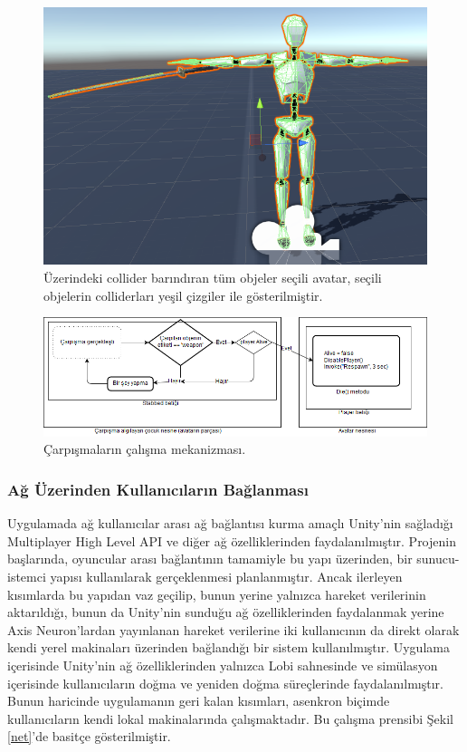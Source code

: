 \documentclass[a4paper, 12pt, titlepage]{article}
\begin{document}
\begin{figure}[ht!]
    \centering
        \includegraphics[width=5in]{images/c2}
    \caption{Üzerindeki collider barındıran tüm objeler seçili avatar, seçili objelerin
             colliderları yeşil çizgiler ile gösterilmiştir.}
    \label{c}
\end{figure}

\begin{figure}[ht!]
    \centering
        \includegraphics[width=6in]{images/col}
    \caption{Çarpışmaların çalışma mekanizması.}
    \label{col}
\end{figure}

\subsubsection{Ağ Üzerinden Kullanıcıların Bağlanması}
Uygulamada ağ kullanıcılar arası ağ bağlantısı kurma amaçlı Unity’nin sağladığı Multiplayer High
Level API ve diğer ağ özelliklerinden faydalanılmıştır. Projenin başlarında, oyuncular arası
bağlantının tamamiyle bu yapı üzerinden, bir sunucu-istemci yapısı kullanılarak gerçeklenmesi
planlanmıştır. Ancak ilerleyen kısımlarda bu yapıdan vaz geçilip, bunun yerine yalnızca hareket
verilerinin aktarıldığı, bunun da Unity’nin sunduğu ağ özelliklerinden faydalanmak yerine Axis
Neuron’lardan yayınlanan hareket verilerine iki kullanıcının da direkt olarak kendi yerel
makinaları üzerinden bağlandığı bir sistem kullanılmıştır. Uygulama içerisinde Unity’nin ağ
özelliklerinden yalnızca Lobi sahnesinde ve simülasyon içerisinde kullanıcıların doğma ve yeniden
doğma süreçlerinde faydalanılmıştır. Bunun haricinde uygulamanın geri kalan kısımları, asenkron
biçimde kullanıcıların kendi lokal makinalarında çalışmaktadır. Bu çalışma prensibi Şekil
\ref{net}’de basitçe gösterilmiştir.
\end{document}
